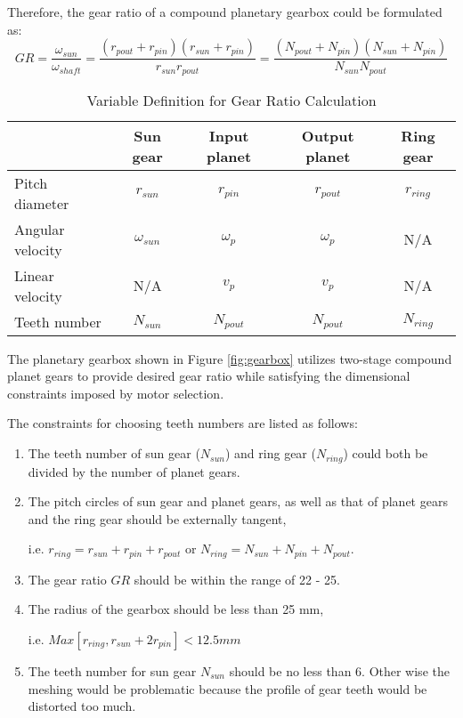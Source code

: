 Therefore, the gear ratio of a compound planetary gearbox could be formulated as:
\begin{equation}
GR = \frac{\omega_{sun}}{\omega_{shaft}} = \frac{(r_{pout}+r_{pin})(r_{sun}+r_{pin})}{r_{sun}r_{pout}} = \frac{(N_{pout}+N_{pin})(N_{sun}+N_{pin})}{N_{sun}N_{pout}}
\end{equation}

\begin{table}[bp]
	\centering
	\caption{Variable Definition for Gear Ratio Calculation}
	\begin{tabular}{lcccc}\hline\hline
		& Sun gear		& Input planet	& Output planet	& Ring gear \\ \hline
		Pitch diameter	& $r_{sun}$	   	& $r_{pin}$		& $r_{pout}$	& $r_{ring}$\\
		Angular velocity& $\omega_{sun}$& $\omega_{p}$	& $\omega_{p}$	& N/A		\\
		Linear velocity	& N/A			& $v_p$			& $v_p$			& N/A		\\
		Teeth number	& $N_{sun}$		& $N_{pout}$	& $N_{pout}$	& $N_{ring}$\\ \hline
	\end{tabular}
	\label{tab:varDefGearbox}
\end{table}

The planetary gearbox shown in Figure \ref{fig:gearbox} utilizes two-stage compound planet gears to provide desired gear ratio while satisfying the dimensional constraints imposed by motor selection. 

The constraints for choosing teeth numbers are listed as follows:

\begin{enumerate}
	\item The teeth number of sun gear ($N_{sun}$) and ring gear ($N_{ring}$) could both be divided by the number of planet gears.
	\item The pitch circles of sun gear and planet gears, as well as that of planet gears and the ring gear should be externally tangent, 
	
	i.e. $r_{ring}=r_{sun}+r_{pin}+r_{pout}$ or $N_{ring}=N_{sun}+N_{pin}+N_{pout}$.
	\item The gear ratio $GR$ should be within the range of 22 - 25.
	\item The radius of the gearbox should be less than 25 mm, 
	
	i.e. $Max[r_{ring},r_{sun}+2r_{pin}]<12.5 mm$
	\item The teeth number for sun gear $N_{sun}$ should be no less than 6. Other wise the meshing would be problematic because the profile of gear teeth would be distorted too much.
\end{enumerate}

